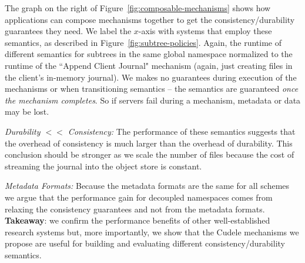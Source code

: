 The graph on the right of Figure~\ref{fig:composable-mechanisms} shows how
applications can compose mechanisms together to get the consistency/durability
guarantees they need.  We label the \(x\)-axis with systems that employ these
semantics, as described in Figure~\ref{fig:subtree-policies}.  Again, the
runtime of different semantics for subtrees in the same global namespace
normalized to the runtime of the ``Append Client Journal" mechanism (again,
just creating files in the client's in-memory journal).  We makes no guarantees
during execution of the mechanisms or when transitioning semantics -- the
semantics are guaranteed {\it once the mechanism completes}. So if servers fail
during a mechanism, metadata or data may be lost.


{\it Durability \(<<\) Consistency:} The performance of these semantics
suggests that the overhead of consistency is much larger than the overhead of
durability. This conclusion should be stronger as we scale the number of files
because the cost of streaming the journal into the object store is constant.

{\it Metadata Formats:} Because the metadata formats are the same for
all schemes we argue that the performance gain for decoupled namespaces comes
from relaxing the consistency guarantees and not from the metadata formats.\\

\noindent\textbf{Takeaway}: we confirm the performance benefits of other
well-established research systems but, more importantly, we show that the
Cudele mechanisms we propose are useful for building and evaluating different
consistency/durability semantics.

